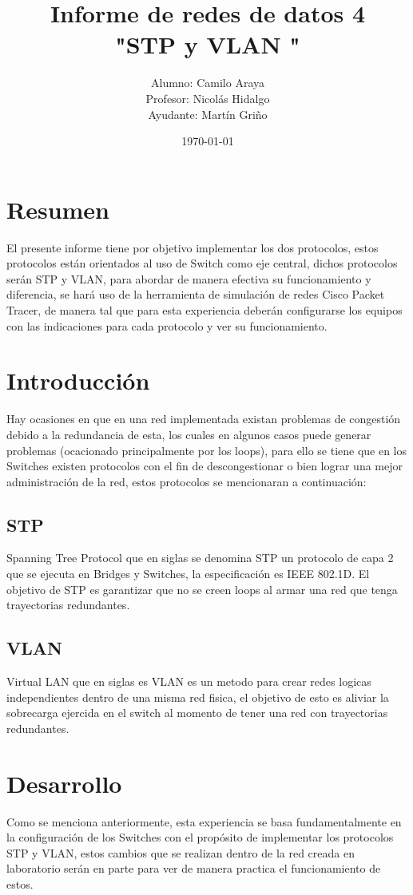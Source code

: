 \documentclass[spanish]{udpreport}
\title{Informe de redes de datos 4\\
"STP y VLAN "\\}
\author{Alumno: Camilo Araya 
\\Profesor: Nicolás Hidalgo\\Ayudante: Martín Griño}
\date{\today}
\begin{document}
\maketitle

\chapter*{Resumen} 
El presente informe tiene por objetivo implementar los dos protocolos, estos protocolos están orientados al uso de Switch como eje central, dichos protocolos serán STP y VLAN, para abordar de manera efectiva su funcionamiento y diferencia, se hará uso de la herramienta de simulación de redes Cisco Packet Tracer, de manera tal que para esta experiencia deberán configurarse los equipos con las indicaciones para cada protocolo y ver su funcionamiento.

\tableofcontents
\chapter{Introducción}
Hay ocasiones en que en una red implementada existan problemas de congestión debido a la redundancia de esta, los cuales en algunos casos puede generar problemas (ocacionado principalmente por los loops), para ello se tiene que en los Switches existen protocolos con el fin de descongestionar o bien lograr una mejor administración de la red, estos protocolos se mencionaran a continuación:
\section{STP}
Spanning Tree Protocol que en siglas se denomina STP un protocolo de capa 2 que se ejecuta en Bridges y Switches, la especificación es IEEE 802.1D. El objetivo de STP es garantizar que no se creen loops al armar una red que tenga trayectorias redundantes.
\section{VLAN}
Virtual LAN que en siglas es VLAN es un metodo para crear redes logicas independientes dentro de una misma red fisica, el objetivo de esto es aliviar la sobrecarga ejercida en el switch al momento de tener una red con trayectorias redundantes.

\chapter{Desarrollo}
Como se menciona anteriormente, esta experiencia se basa fundamentalmente en la configuración de los Switches con el propósito de implementar los protocolos STP y VLAN, estos cambios que se realizan dentro de la red creada en laboratorio serán en parte para ver de manera practica el funcionamiento de estos.
\end{document}
